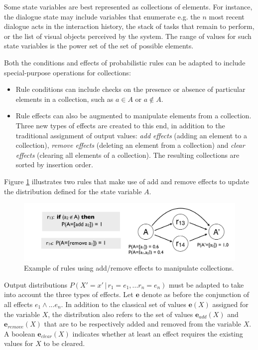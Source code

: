Some state variables are best represented as collections of elements. For instance, the dialogue state may include variables that enumerate e.g. the $n$ most recent dialogue acts in the interaction history, the stack of tasks that remain to perform, or the list of visual objects perceived by the system.  The range of values for such state variables is the power set of the set of possible elements. 

Both the conditions and effects of probabilistic rules can be adapted to include special-purpose operations for collections:
\begin{itemize}
\item Rule conditions can include checks on the presence or absence of particular elements in a collection, such as $a \in A$ or $a \notin A$. 
\item Rule effects can also be augmented to manipulate elements from a collection.  Three new types of effects are created to this end, in addition to the traditional assignment of output values: \textit{add effects} (adding an element to a collection), \textit{remove effects} (deleting an element from a collection) and \textit{clear effects} (clearing all elements of a collection). The resulting collections are sorted by insertion order. 
\end{itemize}

Figure \ref{fig:seteffects} illustrates two rules that make use of add and remove effects to update the distribution defined for the state variable $A$. 
 
\begin{figure}[h]
\centering
\includegraphics[scale=0.25]{imgs/seteffects.pdf}
\caption{Example of rules using add/remove effects to manipulate collections.}
\label{fig:seteffects}
\end{figure}


Output distributions $P(X'\!=\!x' \, | \, r_1\!=\!e_1,... r_n\!=\!e_n)$ must be adapted to take into account the three types of effects.  Let $\mathbf{e}$ denote as before the conjunction of all effects $e_1 \land ... e_n$. In addition to the classical set of values $\mathbf{e}(X)$ assigned for the variable $X$, the distribution also refers to the set of values $\mathbf{e}_{add}(X)$ and $\mathbf{e}_{remove}(X)$ that are to be respectively added and removed from the variable $X$.  A boolean  $\mathbf{e}_{clear}(X)$ indicates whether at least an effect requires the existing values for $X$ to be cleared.

